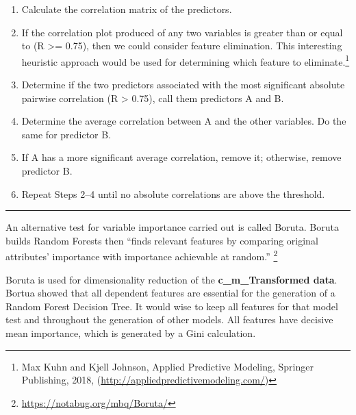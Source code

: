 \documentclass[]{article}
\begin{document}
\begin{enumerate}
\def\labelenumi{\arabic{enumi}.}
\item
  Calculate the correlation matrix of the predictors.
\item
  If the correlation plot produced of any two variables is greater than
  or equal to (\textbar{}R\textbar{} \textgreater{}= 0.75), then we
  could consider feature elimination. This interesting heuristic
  approach would be used for determining which feature to
  eliminate.\footnote{Max Kuhn and Kjell Johnson, Applied Predictive
    Modeling, Springer Publishing, 2018,
    (\url{http://appliedpredictivemodeling.com/})}
\item
  Determine if the two predictors associated with the most significant
  absolute pairwise correlation (R \textgreater{}
  \textbar{}0.75\textbar{}), call them predictors A and B.
\item
  Determine the average correlation between A and the other variables.
  Do the same for predictor B.
\item
  If A has a more significant average correlation, remove it; otherwise,
  remove predictor B.
\item
  Repeat Steps 2--4 until no absolute correlations are above the
  threshold.
\end{enumerate}

\begin{center}\rule{0.5\linewidth}{0.5pt}\end{center}

An alternative test for variable importance carried out is called
Boruta. Boruta builds Random Forests then ``finds relevant features by
comparing original attributes' importance with importance achievable at
random.'' \footnote{\url{https://notabug.org/mbq/Boruta/}}

Boruta is used for dimensionality reduction of the
\textbf{c\_m\_Transformed data}. Bortua showed that all dependent
features are essential for the generation of a Random Forest Decision
Tree. It would wise to keep all features for that model test and
throughout the generation of other models. All features have decisive
mean importance, which is generated by a Gini calculation.
\end{document}
